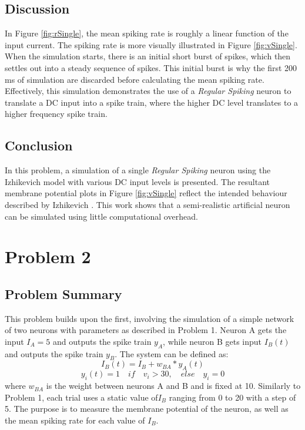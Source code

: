 \documentclass[a4paper, 11pt, titlepage]{article}
\newcommand{\figRef}[1]{Figure \ref{#1}}
\begin{document}
  \subsection{Discussion}
  \par In \figRef{fig:rSingle}, the mean spiking rate is roughly a linear
  function of the input current.
  The spiking rate is more visually illustrated in \figRef{fig:vSingle}.
  When the simulation starts, there is an initial short burst of spikes, which
  then settles out into a steady sequence of spikes.
  This initial burst is why the first 200 ms of simulation are discarded before
  calculating the mean spiking rate.
  Effectively, this simulation demonstrates the use of a \textit{Regular
  Spiking} neuron to translate a DC input into a spike train, where the higher
  DC level translates to a higher frequency spike train.
  \subsection{Conclusion}
  In this problem, a simulation of a single \textit{Regular Spiking} neuron
  using the Izhikevich model \cite{Izhikevich2003} with various DC input levels
  is presented.
  The resultant membrane potential plots in \figRef{fig:vSingle} reflect the
  intended behaviour described by Izhikevich \cite{Izhikevich2003,
  Izhikevich2004}.
  This work shows that a semi-realistic artificial neuron can be simulated
  using little computational overhead.
  \pagebreak
  \section{Problem 2}
  \subsection{Problem Summary}
  This problem builds upon the first, involving the simulation of a simple
  network of two neurons with parameters as described in Problem 1.
  Neuron A gets the input $I_{A} = 5$ and outputs the spike train $y_{A}$,
  while neuron B gets input $I_{B}(t)$ and outputs the spike train $y_{B}$.
  The system can be defined as:
  \begin{equation}
    I_{B}(t) = I_{B} + w_{BA} * y_{A}(t)
    \label{eq:IB}
  \end{equation}
  \begin{equation}
    y_{i}(t) = 1 \quad if \quad v_{i} > 30, \quad else \quad y_{i} = 0
    \label{eq:spiketrain}
  \end{equation}
  where $w_{BA}$ is the weight between neurons A and B and is fixed at 10.
  Similarly to Problem 1, each trial uses a static value of$I_{B}$ ranging
  from 0 to 20 with a step of 5.
  The purpose is to measure the membrane potential of the neuron, as well as
  the mean spiking rate for each value of $I_{B}$.
\end{document}
